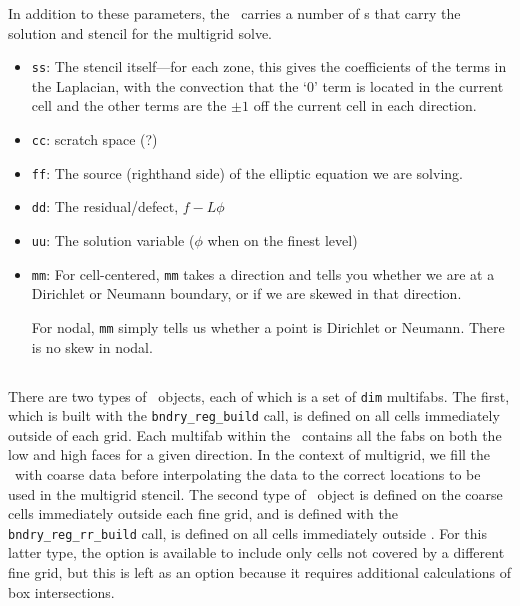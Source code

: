 In addition to these parameters, the \mgtower\ carries a number of
\multifab s that carry the solution and stencil for the multigrid
solve.

\begin{itemize}

\item {\tt ss}: The stencil itself---for each zone, this gives the 
  coefficients of the terms in the Laplacian, with the convection that
  the `0' term is located in the current cell and the other terms are
  the $\pm 1$ off the current cell in each direction.

\item {\tt cc}: scratch space (?)

\item {\tt ff}: The source (righthand side) of the elliptic equation
  we are solving.

\item {\tt dd}: The residual/defect, $f - L\phi$

\item {\tt uu}: The solution variable ($\phi$ when on the finest level)

\item {\tt mm}: For cell-centered, {\tt mm} takes a direction and
   tells you whether we are at a Dirichlet or Neumann boundary, or if 
   we are skewed in that direction.

   For nodal, {\tt mm} simply tells us whether a point is Dirichlet
   or Neumann.  There is no skew in nodal.

\end{itemize}


\subsection{\bndryreg}

There are two types of \bndryreg\ objects, each of which is a set of 
{\tt dim} multifabs.  The first, which is built with 
the {\tt bndry\_reg\_build} call, is defined on all cells immediately outside
of each grid.  Each multifab within the \bndryreg\ contains all the fabs on both
the low and high faces for a given direction.  In the context of 
multigrid, we fill the \bndryreg\ with coarse data before interpolating the data
to the correct locations to be used in the multigrid stencil.  The second type
of \bndryreg\ object is defined on the coarse cells immediately outside each
fine grid, and is defined with the  {\tt bndry\_reg\_rr\_build} call, is defined on all cells immediately outside
.  For this latter type, the option is available to include only cells 
not covered by a different fine grid, but this is left as an option because it
requires additional calculations of box intersections.

